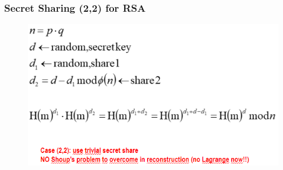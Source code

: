 \documentclass{book}
\begin{document}
\subsubsection{Secret Sharing (2,2) for RSA}
\begin{figure}[h]
    \includegraphics[scale=0.5]{2022-01-06-17-30-36.png}%
\end{figure}
\end{document}
